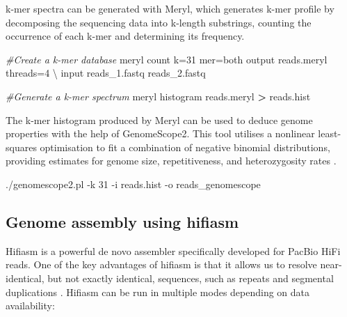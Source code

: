 \documentclass[
]{book}
\newenvironment{Shaded}{\begin{snugshade}}{\end{snugshade}}
\newcommand{\AttributeTok}[1]{\textcolor[rgb]{0.13,0.29,0.53}{#1}}
\newcommand{\CommentTok}[1]{\textcolor[rgb]{0.56,0.35,0.01}{\textit{#1}}}
\newcommand{\DataTypeTok}[1]{\textcolor[rgb]{0.13,0.29,0.53}{#1}}
\newcommand{\ExtensionTok}[1]{#1}
\newcommand{\NormalTok}[1]{#1}
\newcommand{\OperatorTok}[1]{\textcolor[rgb]{0.81,0.36,0.00}{\textbf{#1}}}
\begin{document}
k-mer spectra can be generated with Meryl, which generates k-mer profile by decomposing the sequencing data into k-length substrings, counting the occurrence of each k-mer and determining its frequency.

\small

\begin{Shaded}
\begin{Highlighting}[]
\CommentTok{\#Create a k{-}mer database}
\ExtensionTok{meryl}\NormalTok{ count k=31 mer=both output reads.meryl threads=4 }\DataTypeTok{\textbackslash{}}
\NormalTok{     input reads\_1.fastq reads\_2.fastq}

\CommentTok{\#Generate a k{-}mer spectrum}
\ExtensionTok{meryl}\NormalTok{ histogram reads.meryl }\OperatorTok{\textgreater{}}\NormalTok{ reads.hist}
\end{Highlighting}
\end{Shaded}

\normalsize

The k-mer histogram produced by Meryl can be used to deduce genome properties with the help of GenomeScope2. This tool utilises a nonlinear least-squares optimisation to fit a combination of negative binomial distributions, providing estimates for genome size, repetitiveness, and heterozygosity rates \citep{Ranallo-Benavidez2020-am}.

\small

\begin{Shaded}
\begin{Highlighting}[]
\ExtensionTok{./genomescope2.pl} \AttributeTok{{-}k}\NormalTok{ 31 }\AttributeTok{{-}i}\NormalTok{ reads.hist }\AttributeTok{{-}o}\NormalTok{ reads\_genomescope}
\end{Highlighting}
\end{Shaded}

\normalsize

\hypertarget{host-genome-assembly-hifiasm}{%
\subsection{Genome assembly using hifiasm}\label{host-genome-assembly-hifiasm}}

Hifiasm is a powerful de novo assembler specifically developed for PacBio HiFi reads. One of the key advantages of hifiasm is that it allows us to resolve near-identical, but not exactly identical, sequences, such as repeats and segmental duplications \citep{Cheng2021-nh}. Hifiasm can be run in multiple modes depending on data availability:
\end{document}
